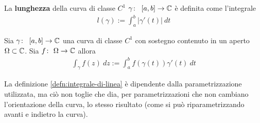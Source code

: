 \begin{definition}
	\label{defn:lunghezza-di-curva-classe-c1}
	La \textbf{lunghezza} della curva di classe $C^1$ $\gamma \colon\ \left[a,b\right] \rightarrow \mathbb{C}$ è definita come l'integrale 
	\begin{equation*}
	\begin{aligned}
	l(\gamma) := \int_{a}^{b} |\gamma'(t)|\ dt
	\end{aligned}
	\end{equation*}
\end{definition}

\begin{definition}
	\label{defn:integrale-di-linea}
	Sia $\gamma \colon\ \left[a,b\right] \rightarrow \mathbb{C}$ una curva di classe $C^1$ con sostegno contenuto in un aperto $\Omega \subset \mathbb{C}$. Sia $f \colon\ \Omega \rightarrow \mathbb{C}$ allora
	\begin{equation*}
	\begin{aligned}
	\int_\gamma f(z)\ dz := \int_{a}^b f(\gamma(t)) \gamma'(t) \ dt
	\end{aligned}
	\end{equation*}  
\end{definition}

\begin{remark}
	La definizione \ref{defn:integrale-di-linea} è dipendente dalla parametrizzazione utilizzata, ma ciò non toglie che dia, per parametrizzazioni che non cambiano l'orientazione della curva, lo stesso risultato (come si può riparametrizzando avanti e indietro la curva).
\end{remark}

